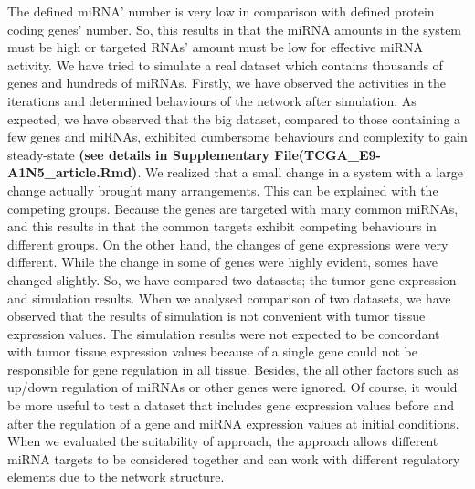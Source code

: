 \documentclass[]{article}
\begin{document}
The defined miRNA' number is very low in comparison with defined protein
coding genes' number. So, this results in that the miRNA amounts in the
system must be high or targeted RNAs' amount must be low for effective
miRNA activity. We have tried to simulate a real dataset which contains
thousands of genes and hundreds of miRNAs. Firstly, we have observed the
activities in the iterations and determined behaviours of the network
after simulation. As expected, we have observed that the big dataset,
compared to those containing a few genes and miRNAs, exhibited
cumbersome behaviours and complexity to gain steady-state \textbf{(see
details in Supplementary File(TCGA\_E9-A1N5\_article.Rmd)}. We realized
that a small change in a system with a large change actually brought
many arrangements. This can be explained with the competing groups.
Because the genes are targeted with many common miRNAs, and this results
in that the common targets exhibit competing behaviours in different
groups. On the other hand, the changes of gene expressions were very
different. While the change in some of genes were highly evident, somes
have changed slightly. So, we have compared two datasets; the tumor gene
expression and simulation results. When we analysed comparison of two
datasets, we have observed that the results of simulation is not
convenient with tumor tissue expression values. The simulation results
were not expected to be concordant with tumor tissue expression values
because of a single gene could not be responsible for gene regulation in
all tissue. Besides, the all other factors such as up/down regulation of
miRNAs or other genes were ignored. Of course, it would be more useful
to test a dataset that includes gene expression values before and after
the regulation of a gene and miRNA expression values at initial
conditions. When we evaluated the suitability of approach, the approach
allows different miRNA targets to be considered together and can work
with different regulatory elements due to the network structure.
\end{document}
